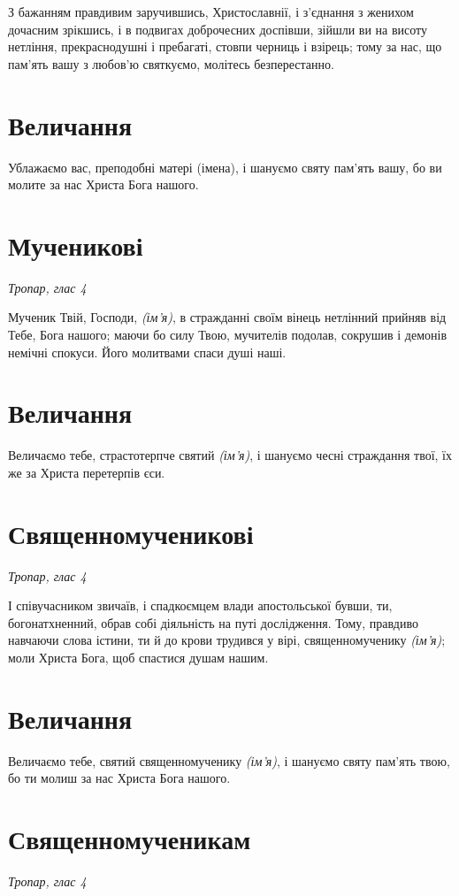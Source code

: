 \documentclass[chapters.tex]{subfiles}
\begin{document}
З бажанням правдивим заручившись, Христославнії, і з’єднання з женихом дочасним зрікшись, і в подвигах доброчесних доспівши, зійшли ви на висоту нетління, прекраснодушні і пребагаті, стовпи черниць і взірець; тому за нас, що пам’ять вашу з любов’ю святкуємо, молітесь безперестанно.

\section{Величання}

Ублажаємо вас, преподобні матері (імена), і шануємо святу пам’ять вашу, бо ви молите за нас Христа Бога нашого.

\section{Мученикові}
\emph{Тропар, глас 4}

Мученик Твій, Господи, \emph{(ім’я)}, в стражданні своїм вінець нетлінний прийняв від Тебе, Бога нашого; маючи бо силу Твою, мучителів подолав, сокрушив і демонів немічні спокуси. Його молитвами спаси душі наші.

\section{Величання}

Величаємо тебе, страстотерпче святий \emph{(ім’я)}, і шануємо чесні страждання твої, їх же за Христа перетерпів єси.

\section{Священномученикові}
\emph{Тропар, глас 4}

І співучасником звичаїв, і спадкоємцем влади апостольської бувши, ти, богонатхненний, обрав собі діяльність на путі дослідження. Тому, правдиво навчаючи слова істини, ти й до крови трудився у вірі, священномученику \emph{(ім’я)}; моли Христа Бога, щоб спастися душам нашим.

\section{Величання}

Величаємо тебе, святий священномученику \emph{(ім’я)}, і шануємо святу пам’ять твою, бо ти молиш за нас Христа Бога нашого.

\section{Священномученикам}
\emph{Тропар, глас 4}
\end{document}
